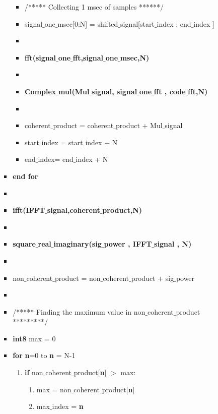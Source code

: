 \documentclass[journal,10pt,onecolumn]{article}
\begin{document}
\begin{itemize}
\begin{enumerate}
\begin{enumerate}
\begin{itemize}
\begin{itemize}
                \item[] /***** Collecting 1 msec of samples ******/
                \item[] signal$\_$one$\_$msec[0:N] = shifted$\_$signal[start$\_$index : end$\_$index ]
                \item[] 
                \item[] \textbf{fft(signal$\_$one$\_$fft,signal$\_$one$\_$msec,N)}
                \item[] 
                \item[] \textbf{Complex$\_$mul(Mul$\_$signal, signal$\_$one$\_$fft , code$\_$fft,N)}
                \item[] 
                \item[] coherent$\_$product = coherent$\_$product +  Mul$\_$signal
                \item[]   start$\_$index =  start$\_$index + N
                \item[]   end$\_$index= end$\_$index + N
            \end{itemize}
            \item[] \textbf{end for}
            \item[] 
            \item[] \textbf{ifft(IFFT$\_$signal,coherent$\_$product,N)}
            \item[] 
            \item[] \textbf{square$\_$real$\_$imaginary(sig$\_$power , IFFT$\_$signal , N)}
            \item[] 
            \item[] non$\_$coherent$\_$product = non$\_$coherent$\_$product +  sig$\_$power
            \item[] 
            \item[]  /***** Finding the maximum value in non$\_$coherent$\_$product *********/
            \item[] \textbf{int8} max = 0
            \item[] \textbf{for} \textbf{n}=0 to \textbf{n} = N-1
            \begin{enumerate}
                \item[] \textbf{if} non$\_$coherent$\_$product[\textbf{n}] $>$ max:
                \begin{enumerate}
                    \item[] max = non$\_$coherent$\_$product[\textbf{n}]
                    \item[] max$\_$index = \textbf{n}
                \end{enumerate}

\end{enumerate}
\end{itemize}
\end{enumerate}
\end{enumerate}
\end{itemize}
\end{document}
